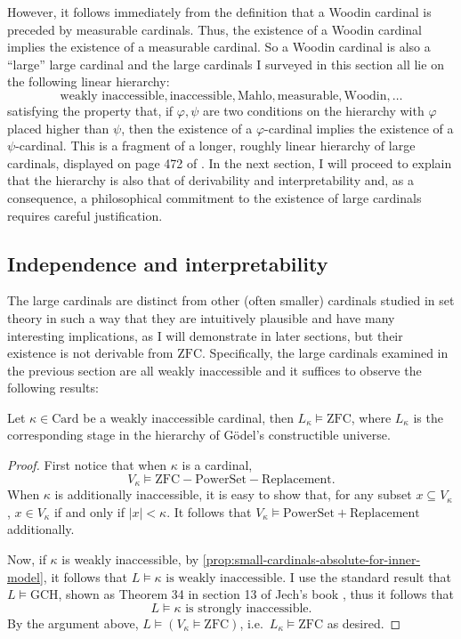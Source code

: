 \documentclass[12pt]{article}
\theoremstyle{plain}
\theoremstyle{definition}
\newcommand{\ZFC}{\mathrm{ZFC}}
\newcommand{\Card}{\mathrm{Card}}
\newcommand{\GCH}{\mathrm{GCH}}
\begin{document}
However, it follows immediately from the definition that a Woodin cardinal is preceded by measurable cardinals. Thus, the existence of a Woodin cardinal implies the existence of a measurable cardinal. So a Woodin cardinal is also a ``large'' large cardinal and the large cardinals I surveyed in this section all lie on the following linear hierarchy:
\[\text{weakly inaccessible}, \text{inaccessible}, \text{Mahlo}, \text{measurable}, \text{Woodin}, \ldots\]
satisfying the property that, if $\varphi, \psi$ are two conditions on the hierarchy with $\varphi$ placed higher than $\psi$, then the existence of a $\varphi$-cardinal implies the existence of a $\psi$-cardinal. This is a fragment of a longer, roughly linear hierarchy of large cardinals, displayed on page 472 of \cite{higher-infinite}. In the next section, I will proceed to explain that the hierarchy is also that of derivability and interpretability and, as a consequence, a philosophical commitment to the existence of large cardinals requires careful justification.

\subsection{Independence and interpretability}
\label{subsec:large-cardinal-independence}

The large cardinals are distinct from other (often smaller) cardinals studied in set theory in such a way that they are intuitively plausible and have many interesting implications, as I will demonstrate in later sections, but their existence is not derivable from $\ZFC$. Specifically, the large cardinals examined in the previous section are all weakly inaccessible and it suffices to observe the following results:

\begin{lemma}
	\label{lem:weakly-inaccessible-cardinal-model-of-zfc}
	Let $\kappa \in \Card$ be a weakly inaccessible cardinal, then $L_\kappa \vDash \ZFC$, where $L_\kappa$ is the corresponding stage in the hierarchy of G\"odel's constructible universe.
\end{lemma}

\begin{proof}
	First notice that when $\kappa$ is a cardinal,
	\[V_\kappa \vDash \ZFC - \text{PowerSet} - \text{Replacement}.\]
	When $\kappa$ is additionally inaccessible, it is easy to show that, for any subset $x \subseteq V_\kappa$, $x \in V_\kappa$ if and only if $\left|x\right| < \kappa$. It follows that $V_\kappa \vDash \text{PowerSet} + \text{Replacement}$ additionally.

	Now, if $\kappa$ is weakly inaccessible, by \autoref{prop:small-cardinals-absolute-for-inner-model}, it follows that $L \vDash \text{$\kappa$ is weakly inaccessible}$. I use the standard result that $L \vDash \GCH$, shown as Theorem 34 in section 13 of Jech's book \cite{jech-set-theory}, thus it follows that
	\[L \vDash \text{$\kappa$ is strongly inaccessible}.\]
	By the argument above, $L \vDash \left(V_\kappa \vDash \ZFC\right)$, i.e.\ $L_\kappa \vDash \ZFC$ as desired.
\end{proof}
\end{document}
